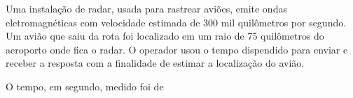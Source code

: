 Uma instalação de radar, usada para rastrear aviões, emite ondas eletromagnéticas com velocidade estimada de 300 mil quilômetros por segundo. Um avião que saiu da rota foi localizado em um raio de 75 quilômetros do aeroporto onde fica o radar. O operador usou o tempo dispendido para enviar e receber a resposta com a finalidade de estimar a localização do avião.\par
{}
O tempo, em segundo, medido foi de\par
\begin{altlinha}
%
%
%
%
\end{altlinha}
